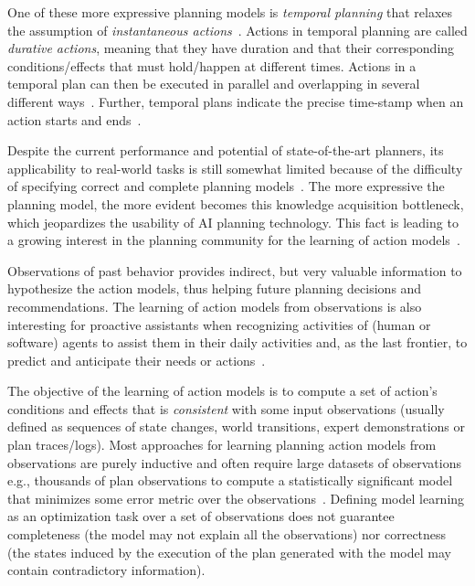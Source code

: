 \documentclass[runningheads]{llncs}
\begin{document}
One of these more expressive planning models is {\em temporal planning} that relaxes the assumption of {\em instantaneous actions}~\cite{fox2003pddl2}. Actions in temporal planning are called {\em durative actions}, meaning that they have duration and that their corresponding conditions/effects that must hold/happen at different times. Actions in a temporal plan can then be executed in parallel and overlapping in several different ways~\cite{cushing2007temporal}. Further, temporal plans indicate the precise time-stamp when an action starts and ends~\cite{howey2004val}.

Despite the current performance and potential of state-of-the-art planners, its applicability to real-world tasks is still somewhat limited because of the difficulty of specifying correct and complete planning models~\cite{kambhampati2007model}. The more expressive the planning model, the more evident becomes this knowledge acquisition bottleneck, which jeopardizes the usability of AI planning technology. This fact is leading to a growing interest in the planning community for the learning of action models~\cite{jimenez2012review}.

Observations of past behavior provides indirect, but very valuable information to hypothesize the action models, thus helping future planning decisions and recommendations. The learning of action models from observations is also interesting for proactive assistants when recognizing activities of (human or software) agents to assist them in their daily activities and, as the last frontier, to predict and anticipate their needs or actions~\cite{ramirez2012,aineto2019icaps}.

The objective of the learning of action models is to compute a set of action's conditions and effects that is {\em consistent} with some input observations (usually defined as sequences of state changes, world transitions, expert demonstrations or plan traces/logs). Most approaches for learning planning action models from observations are purely inductive and often require large datasets of observations e.g., thousands of plan observations to compute a statistically significant model that minimizes some error metric over the observations~\cite{yang2007learning,MouraoZPS12,zhuo2013action,kuvcera2018louga}. Defining model learning as an optimization task over a set of observations does not guarantee completeness (the model may not explain all the observations) nor correctness (the states induced by the execution of the plan generated with the model may contain contradictory information).
\end{document}
